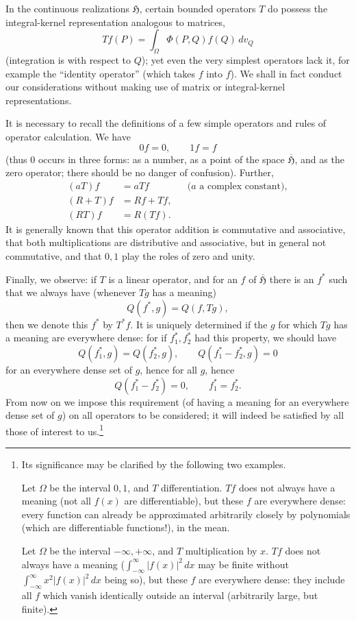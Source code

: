 \documentclass[fontsize=13pt,paper=b5,twoside,bookmarkpackage=false]{scrartcl}
\begin{document}
In the continuous realizations $\mathfrak{H}$, certain bounded operators $T$ do possess the integral-kernel representation analogous to matrices,
\[
 Tf(P)=\int_\Omega \Phi(P,Q)f(Q)\,dv_Q
\]
(integration is with respect to $Q$); yet even the very simplest operators lack it, for example the ``identity operator'' (which takes $f$ into $f$). We shall in fact conduct our considerations without making use of matrix or integral-kernel representations.

It is necessary to recall the definitions of a few simple operators and rules of operator calculation. We have
\[
 0f=0,\qquad 1f=f
\]
(thus $0$ occurs in three forms: as a number, as a point of the space $\overline{\mathfrak{H}}$, and as the zero operator; there should be no danger of confusion). Further,
\begin{align*}
 (aT)f&=aTf &&\text{($a$ a complex constant)},\\
 (R+T)f&=Rf+Tf,\\
 (RT)f&=R(Tf).
\end{align*}
It is generally known that this operator addition is commutative and associative, that both multiplications are distributive and associative, but in general not commutative, and that $0,1$ play the roles of zero and unity.

Finally, we observe: if $T$ is a linear operator, and for an $f$ of $\overline{\mathfrak{H}}$ there is an $f^*$ such that we always have (whenever $Tg$ has a meaning)
\[
 Q(f^*,g)=Q(f,Tg),
\]
then we denote this $f^*$ by $T^*f$. It is uniquely determined if the $g$ for which $Tg$ has a meaning are everywhere dense: for if $f_1^*,f_2^*$ had this property, we should have
\[
 Q(f_1^*,g)=Q(f_2^*,g),\qquad Q(f_1^*-f_2^*,g)=0
\]
for an everywhere dense set of $g$, hence for all $g$, hence
\[
 Q(f_1^*-f_2^*)=0,\qquad f_1^*=f_2^*.
\]
From now on we impose this requirement (of having a meaning for an everywhere dense set of $g$) on all operators to be considered; it will indeed be satisfied by all those of interest to us.\footnote[22]{\label{fn:22}Its significance may be clarified by the following two examples.

Let $\Omega$ be the interval $0,1$, and $T$ differentiation. $Tf$ does not always have a meaning (not all $f(x)$ are differentiable), but these $f$ are everywhere dense: every function can already be approximated arbitrarily closely by polynomials (which are differentiable functions!), in the mean.

Let $\Omega$ be the interval $-\infty,+\infty$, and $T$ multiplication by $x$. $Tf$ does not always have a meaning ($\int_{-\infty}^{\infty}|f(x)|^2\,dx$ may be finite without $\int_{-\infty}^{\infty}x^2|f(x)|^2\,dx$ being so), but these $f$ are everywhere dense: they include all $f$ which vanish identically outside an interval (arbitrarily large, but finite).}
\end{document}
